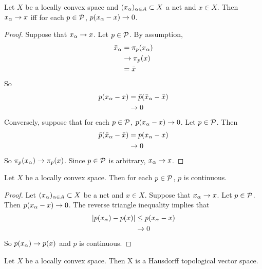 \documentclass{book}
\begin{document}
	\begin{ex}
		Let $X$ be a locally convex space and $(x_{\alpha})_{\alpha \in A} \subset X$ a net and $x \in X$. Then $x_{\alpha} \rightarrow x$ iff for each $p \in \mathcal{P}$, $p(x_{\alpha} - x) \rightarrow 0$.
	\end{ex}
	
	\begin{proof}
		Suppose that $x_{\alpha} \rightarrow x$. Let $p \in \mathcal{P}$. 
		By assumption,  
		\begin{align*}
			\bar{x}_{\alpha} 
			&= \pi_p(x_{\alpha}) \\
			&\rightarrow \pi_p(x) \\
			&= \bar{x}
		\end{align*}   
		So 
		\begin{align*}
			p(x_{\alpha} - x) 
			&= \bar{p}(\bar{x}_{\alpha} - \bar{x}) \\
			& \rightarrow 0
		\end{align*}
		Conversely, suppose that for each $p \in \mathcal{P}$, $p(x_{\alpha} - x) \rightarrow 0$. Let $p \in \mathcal{P}$. Then 
		\begin{align*}
			\bar{p}(\bar{x}_{\alpha} - \bar{x}) 
			&= p(x_{\alpha} - x) \\
			& \rightarrow 0
		\end{align*} 
		So $\pi_p(x_{\alpha}) \rightarrow \pi_p(x)$. Since $p \in \mathcal{P}$ is arbitrary, $x_{\alpha} \rightarrow x$. 
	\end{proof}
	
	\begin{ex}
		Let $X$ be a locally convex space. Then for each $p \in \mathcal{P}$, $p$ is continuous. 
	\end{ex}
	
	\begin{proof}
		Let $(x_{\alpha})_{\alpha \in A} \subset X$ be a net and $x \in X$. Suppose that $x_{\alpha} \rightarrow x$. Let $p \in \mathcal{P}$. Then $p(x_{\alpha} - x) \rightarrow 0$. The reverse triangle inequality implies that 
		\begin{align*}
			|p(x_{\alpha}) - p(x)| 
			& \leq p(x_{\alpha} - x) \\
			& \rightarrow 0
		\end{align*}
		So $p(x_{\alpha}) \rightarrow p(x)$ and $p$ is continuous. 
	\end{proof}
	
	\begin{ex}
		Let $X$ be a locally convex space. Then X is a Hausdorff topological vector space.
	\end{ex}
	
\end{document}
